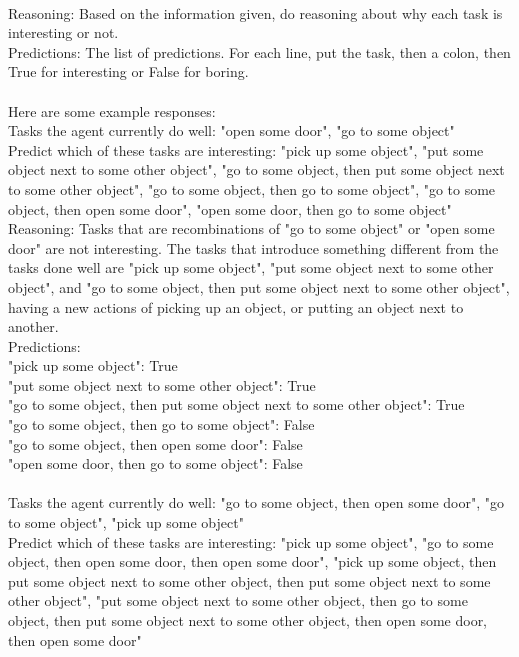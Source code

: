 \documentclass{article} %
\begin{document}
{\\Reasoning: Based on the information given, do reasoning about why each task is interesting or not.
\\Predictions: The list of predictions. For each line, put the task, then a colon, then True for interesting or False for boring.
\\
\\Here are some example responses:
\\Tasks the agent currently do well: "open some door", "go to some object"
\\Predict which of these tasks are interesting: "pick up some object", "put some object next to some other object", "go to some object, then put some object next to some other object", "go to some object, then go to some object", "go to some object, then open some door", "open some door, then go to some object"
\\Reasoning: Tasks that are recombinations of "go to some object" or "open some door" are not interesting. The tasks that introduce something different from the tasks done well are "pick up some object", "put some object next to some other object", and "go to some object, then put some object next to some other object", having a new actions of picking up an object, or putting an object next to another.
\\Predictions:
\\"pick up some object": True
\\"put some object next to some other object": True
\\"go to some object, then put some object next to some other object": True
\\"go to some object, then go to some object": False
\\"go to some object, then open some door": False
\\"open some door, then go to some object": False
\\
\\Tasks the agent currently do well: "go to some object, then open some door", "go to some object", "pick up some object"
\\Predict which of these tasks are interesting: "pick up some object", "go to some object, then open some door, then open some door", "pick up some object, then put some object next to some other object, then put some object next to some other object", "put some object next to some other object, then go to some object, then put some object next to some other object, then open some door, then open some door"
}
\end{document}
